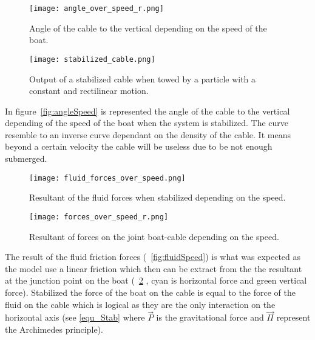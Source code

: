 \begin{figure}[H]
\centering
    \begin{minipage}[b]{0.4\textwidth}
    \centering
    \texttt{[image: angle\_over\_speed\_r.png]}
    \caption{Angle of the cable to the vertical depending on the speed of the boat.}
    \label{fig:angleSpeed}
    \end{minipage}
    \hfill
    \begin{minipage}[b]{0.45\textwidth}
    \centering
    \texttt{[image: stabilized\_cable.png]}
    \caption{Output of a stabilized cable when towed by a particle with a constant and rectilinear motion.}
    \label{fig:stabCable}
    \end{minipage}
\end{figure}

In figure~\ref{fig:angleSpeed} is represented the angle of the cable to the vertical depending of the speed of the 
boat when the system is stabilized. The curve resemble to an inverse curve dependant on the density of the cable.
It means beyond a certain velocity the cable will be useless due to be not enough submerged.

\begin{figure}[H]
\centering
    \begin{minipage}[b]{0.4\textwidth}
    \centering
    \texttt{[image: fluid\_forces\_over\_speed.png]}
    \caption{Resultant of the fluid forces when stabilized depending on the speed.}
    \label{fig:fluidSpeed}
    \end{minipage}
    \hfill
    \begin{minipage}[b]{0.45\textwidth}
    \centering
    \texttt{[image: forces\_over\_speed\_r.png]}
    \caption{Resultant of forces on the joint boat-cable depending on the speed.}
    \label{fig:forceSpeed}
    \end{minipage}
\end{figure}

The result of the fluid friction forces (~\ref{fig:fluidSpeed}) is what was expected as the model use a linear friction which then can be extract from the the resultant at the junction point on the boat (~\ref{fig:forceSpeed} , cyan is horizontal force and green vertical force). Stabilized the force of the boat on the cable is equal to the force of the fluid on the cable which is logical as they are the only interaction on the horizontal axis (see \eqref{equ_Stab} where $\vec{P}$ is the gravitational force and $\vec{\Pi}$ represent the Archimedes principle).

